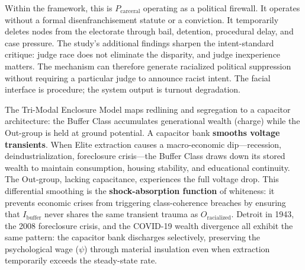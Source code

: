 Within the framework, this is $P_{\text{carceral}}$ operating as a political firewall. It operates without a formal disenfranchisement statute or a conviction. It temporarily deletes nodes from the electorate through bail, detention, procedural delay, and case pressure. The study's additional findings sharpen the intent-standard critique: judge race does not eliminate the disparity, and judge inexperience matters. The mechanism can therefore generate racialized political suppression without requiring a particular judge to announce racist intent. The facial interface is procedure; the system output is turnout degradation.



\begin{keyinsight}
The Tri-Modal Enclosure Model maps redlining and segregation to a capacitor architecture: the Buffer Class accumulates generational wealth (charge) while the Out-group is held at ground potential. A capacitor bank \textbf{smooths voltage transients}. When Elite extraction causes a macro-economic dip---recession, deindustrialization, foreclosure crisis---the Buffer Class draws down its stored wealth to maintain consumption, housing stability, and educational continuity. The Out-group, lacking capacitance, experiences the full voltage drop. This differential smoothing is the \textbf{shock-absorption function} of whiteness: it prevents economic crises from triggering class-coherence breaches by ensuring that $I_{\text{buffer}}$ never shares the same transient trauma as $O_{\text{racialized}}$. Detroit in 1943, the 2008 foreclosure crisis, and the COVID-19 wealth divergence all exhibit the same pattern: the capacitor bank discharges selectively, preserving the psychological wage ($\psi$) through material insulation even when extraction temporarily exceeds the steady-state rate.
\end{keyinsight}






